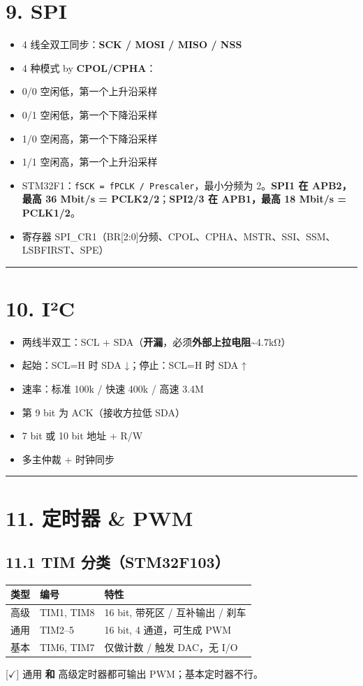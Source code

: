 \documentclass[UTF8,zihao=-5]{ctexart}
\renewcommand{\arraystretch}{0.9}
\newcommand{\hint}[1]{{\color{gray!35!black}\footnotesize #1}}
\newcommand{\okmark}{\ensuremath{\checkmark}}
\begin{document}
\begin{multicols*}{2}
\section*{9. SPI}
\begin{itemize}
\item 4 线全双工同步：\textbf{SCK / MOSI / MISO / NSS}
\item 4 种模式 by \textbf{CPOL/CPHA}：
\item 0/0 空闲低，第一个上升沿采样
\item 0/1 空闲低，第一个下降沿采样
\item 1/0 空闲高，第一个下降沿采样
\item 1/1 空闲高，第一个上升沿采样
\item STM32F1：\texttt{fSCK = fPCLK / Prescaler}，最小分频为 2。\textbf{SPI1 在 APB2，最高 36 Mbit/s = PCLK2/2}；\textbf{SPI2/3 在 APB1，最高 18 Mbit/s = PCLK1/2}。
\item 寄存器 SPI\_CR1（BR[2:0]分频、CPOL、CPHA、MSTR、SSI、SSM、LSBFIRST、SPE）
\end{itemize}
\vspace{1pt}\hrule\vspace{1pt}
\section*{10. I²C}
\begin{itemize}
\item 两线半双工：SCL + SDA（\textbf{开漏}，必须\textbf{外部上拉电阻}\textasciitilde{}4.7kΩ）
\item 起始：SCL=H 时 SDA ↓；停止：SCL=H 时 SDA ↑
\item 速率：标准 100k / 快速 400k / 高速 3.4M
\item 第 9 bit 为 ACK（接收方拉低 SDA）
\item 7 bit 或 10 bit 地址 + R/W
\item 多主仲裁 + 时钟同步
\end{itemize}
\vspace{1pt}\hrule\vspace{1pt}
\section*{11. 定时器 \& PWM}
\subsection*{11.1 TIM 分类（STM32F103）}
{\scriptsize\setlength{\tabcolsep}{1.8pt}\renewcommand{\arraystretch}{0.88}%
\begin{tabularx}{\linewidth}{@{}*{3}{Y}@{}}
\toprule
\textbf{类型} & \textbf{编号} & \textbf{特性} \\
\midrule
高级 & TIM1, TIM8 & 16 bit, 带死区 / 互补输出 / 刹车 \\
通用 & TIM2–5 & 16 bit, 4 通道，可生成 PWM \\
基本 & TIM6, TIM7 & 仅做计数 / 触发 DAC，无 I/O \\
\bottomrule
\end{tabularx}}
\hint{[\okmark] 通用 \textbf{和} 高级定时器都可输出 PWM；基本定时器不行。}\par

\end{multicols*}
\end{document}
